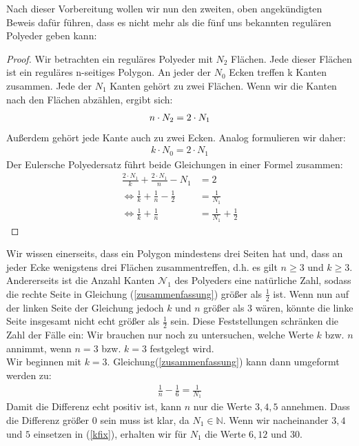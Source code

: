 Nach dieser Vorbereitung wollen wir nun den zweiten, oben angekündigten Beweis dafür führen, dass es nicht mehr als die fünf uns bekannten regulären Polyeder geben kann: 
\begin{proof}
Wir betrachten ein reguläres Polyeder mit $N_2$ Flächen. Jede dieser Flächen ist ein reguläres n-seitiges Polygon. 
An jeder der $N_0$ Ecken treffen k Kanten zusammen.
Jede der $N_1$ Kanten gehört zu zwei Flächen. Wenn wir die Kanten nach den Flächen abzählen, ergibt sich:  
\begin{align}
\setcounter{equation}{0}
n\cdot N_2= 2\cdot N_1 \label{start1}
\end{align}
Außerdem gehört jede Kante auch zu zwei Ecken. Analog formulieren wir daher: 
\begin{align}
k\cdot N_0=2 \cdot N_1 \label{start2}
\end{align}
Der Eulersche Polyedersatz führt beide Gleichungen in einer Formel zusammen: 
\begin{align}
\frac{2\cdot N_1}{k} + \frac{2\cdot N_1}{n} - N_1 &= 2 \\
\Leftrightarrow \frac{1}{k} + \frac{1}{n} - \frac{1}{2} &= \frac{1}{N_1}\\
\Leftrightarrow \frac{1}{k} + \frac{1}{n}  &= \frac{1}{N_1} + \frac{1}{2}\label{zusammenfassung}
\end{align}
\end{proof}
Wir wissen einerseits, dass ein Polygon mindestens drei Seiten hat und, dass an jeder Ecke wenigstens drei Flächen zusammentreffen, d.h. es gilt $n\geq 3$ und $k\geq 3$. Andererseits ist die Anzahl Kanten $\mathcal{N}_1$ des Polyeders eine natürliche Zahl, sodass die rechte Seite in Gleichung (\ref{zusammenfassung}) größer als $\frac{1}{2}$ ist. Wenn nun auf der linken Seite der Gleichung jedoch $k$ und $n$ größer als 3 wären, könnte die linke Seite insgesamt nicht echt größer als $\frac{1}{2}$  sein. Diese Feststellungen schränken die Zahl der Fälle ein: Wir brauchen nur noch zu untersuchen, welche Werte $k$ bzw. $n$ annimmt, wenn $n=3$ bzw. $k=3$ festgelegt wird.\\
Wir beginnen mit $k=3$.
Gleichung(\ref{zusammenfassung}) kann dann umgeformt werden zu: 
\begin{align}
\frac{1}{n}- \frac{1}{6}= \frac{1}{N_1} \label{kfix}
\end{align}
Damit die Differenz echt positiv ist, kann $n$ nur die Werte $3, 4, 5$ annehmen. Dass die Differenz größer 0 sein muss ist klar, da $N_1 \in \mathbb{N}$. 
Wenn wir nacheinander $3,4$ und $5$ einsetzen in (\ref{kfix}), erhalten wir für $N_1$ die Werte $6, 12$ und $30$.\\
